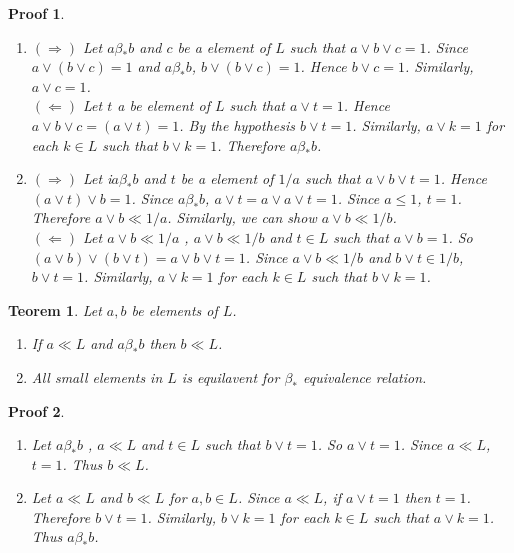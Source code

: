\documentclass[a4paper,12pt]{article}
\numberwithin{equation}{section}
\theoremstyle{italik}
\newtheorem{teorem}{Teorem}[section]
\newtheorem*{ispat}{Proof}
\begin{document}
\begin{ispat}
  \begin{enumerate}
    \item
      $ ( \Rightarrow ) $
      Let $ a \beta_* b$ and $ c $ be a element of $ L $ such that $ a \vee b \vee c = 1 $. Since $ a \vee ( b \vee c ) = 1 $ and 
      $ a \beta_* b $, $ b \vee ( b \vee c ) = 1 $. Hence $ b \vee c = 1 $. Similarly, $ a \vee c = 1 $. \\
      $( \Leftarrow )$
      Let $ t $ a be element of $ L $ such that $ a \vee t = 1 $. 
      Hence $ a \vee b \vee c = ( a \vee t ) = 1 $. By the hypothesis $ b \vee t = 1 $. 
      Similarly, $ a \vee k = 1 $ for each $ k \in L $ such that $ b \vee k = 1 $. 
      Therefore $ a \beta_* b $.
    \item
      $ ( \Rightarrow ) $
      Let i$ a \beta_* b $ and $ t $ be a element of $ 1/a $ such that $ a \vee b \vee t = 1 $. 
      Hence $ ( a \vee t ) \vee b = 1 $. Since $ a \beta_* b $, $ a \vee t = a \vee a \vee t = 1 $. 
      Since $ a \leq 1 $, $ t=1 $. Therefore $ a \vee b \ll 1/a $. 
      Similarly, we can show $ a \vee b \ll 1/b $. \\
      $( \Leftarrow )$
      Let $ a \vee b \ll 1/a $ , $ a \vee b \ll 1/b $ and $ t \in L $ such that $ a \vee b = 1 $. 
      So $ ( a \vee b ) \vee ( b \vee t ) = a \vee b \vee t = 1 $. Since $ a \vee b \ll 1/b $ and 
      $ b \vee t \in 1/b $, $ b \vee t = 1 $. 
      Similarly, $ a \vee k = 1 $ for each $ k \in L $ such that $ b \vee k = 1 $. 
  \end{enumerate}
\end{ispat}

\begin{teorem} \label{4}
  Let $ a,b $ be elements of $ L $.
  \begin{enumerate}
    \item
      If $ a \ll L $ and $ a \beta_* b $ then $ b \ll L $.
    \item
      All small elements in $ L $ is equilavent for $ \beta_* $ equivalence relation.
  \end{enumerate}
\end{teorem}

\begin{ispat}
  \begin{enumerate}
    \item
      Let $ a \beta_* b $ , $ a \ll L $ and $ t \in L $ such that $ b \vee t = 1 $. 
      So $ a \vee t = 1 $. Since $ a \ll L $, $ t = 1 $. Thus $ b \ll L $. 
    \item
      Let $ a \ll L $ and $ b \ll L $ for $ a,b \in L $. Since $ a \ll L $, if $ a \vee t = 1 $ 
      then $ t = 1 $. Therefore $ b \vee t = 1 $. 
      Similarly, $ b \vee k = 1 $ for each $ k \in L $ such that $ a \vee k = 1 $. 
      Thus $ a \beta_* b $. 
  \end{enumerate}
\end{ispat}
\end{document}
